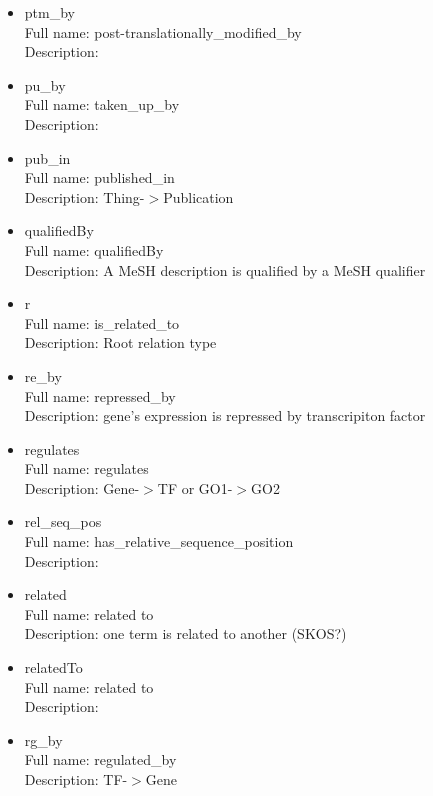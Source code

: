 \begin{itemize}
\item{ptm\_by}\\ Full name: post-translationally\_modified\_by\\ Description: 

\item{pu\_by}\\ Full name: taken\_up\_by\\ Description: 

\item{pub\_in}\\ Full name: published\_in\\ Description: Thing-$>$Publication 

\item{qualifiedBy}\\ Full name: qualifiedBy\\ Description: A MeSH description is qualified by a MeSH qualifier 

\item{r}\\ Full name: is\_related\_to\\ Description: Root relation type 

\item{re\_by}\\ Full name: repressed\_by\\ Description: gene's expression is repressed by transcripiton factor 

\item{regulates}\\ Full name: regulates\\ Description: Gene-$>$TF or GO1-$>$GO2 

\item{rel\_seq\_pos}\\ Full name: has\_relative\_sequence\_position\\ Description: 

\item{related}\\ Full name: related to\\ Description: one term is related to another (SKOS?) 

\item{relatedTo}\\ Full name: related to\\ Description: 

\item{rg\_by}\\ Full name: regulated\_by\\ Description: TF-$>$Gene 


\end{itemize}
